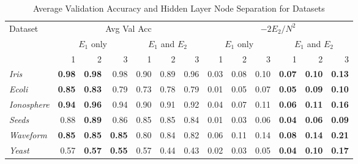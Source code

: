 \begin{table*}[t!]
  \centering
  \small
  \begin{tabular}{|l|r|r|r|r|r|r|r|r|r|r|r|r|}
    \hline
    Dataset & 
    \multicolumn{6}{c|}{Avg Val Acc} & 
    \multicolumn{6}{c|}{$-2E_2/N^2$} \\
    \cline{2-13}
    & \multicolumn{3}{c|}{$E_1$ only} &
    \multicolumn{3}{c|}{$E_1$ and $E_2$} &
    \multicolumn{3}{c|}{$E_1$ only} &
    \multicolumn{3}{c|}{$E_1$ and $E_2$} \\
    \cline{2-13}
    & 1 & 2 & 3 & 1 & 2 & 3 & 1 & 2 & 3 & 1 & 2 & 3 \\
    \hline
    \textit{Iris} & \textbf{0.98} & \textbf{0.98} & 0.98 & 0.90 & 0.89 & 0.96 & 0.03 &0.08 & 0.10 & \textbf{0.07} & \textbf{0.10} & \textbf{0.13} \\
    \textit{Ecoli} & \textbf{0.85} & \textbf{0.83} & 0.79 & 0.73 & 0.78 & 0.79 & 0.01 & 0.05 & 0.07 & \textbf{0.05} & \textbf{0.09} & \textbf{0.10} \\
    \textit{Ionosphere} & \textbf{0.94} & \textbf{0.96} & 0.94 & 0.90 & 0.91 & 0.92 & 0.04 & 0.07 & 0.11 & \textbf{0.06} & \textbf{0.11} & \textbf{0.16} \\
    \textit{Seeds} & 0.88 & \textbf{0.89} & 0.86 & 0.85 & 0.85 & 0.84 & 0.01 & 0.03 & 0.06 & \textbf{0.04} & \textbf{0.06} & \textbf{0.09} \\
    \textit{Waveform} & \textbf{0.85} & \textbf{0.85} & \textbf{0.85} & 0.80 & 0.84 & 0.82 & 0.06 & 0.11 & 0.14 & \textbf{0.08} & \textbf{0.14} & \textbf{0.21} \\
    \textit{Yeast} & 0.57 & \textbf{0.57} & \textbf{0.55} & 0.57 & 0.44 & 0.43 & 0.02 & 0.03 & 0.05 & \textbf{0.04} & \textbf{0.10} & \textbf{0.17} \\
    \hline
  \end{tabular}
  \caption{Average Validation Accuracy and Hidden Layer Node Separation for Datasets }
  \label{tab:e1_e2_avgs}  
\end{table*}

